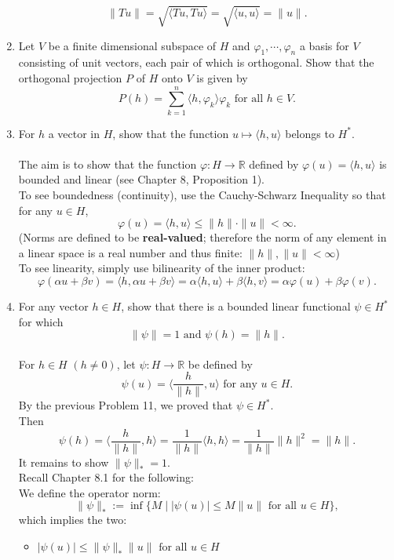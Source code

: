 \begin{enumerate}
    \[
        \|Tu\|=\sqrt{\langle Tu,Tu\rangle}=\sqrt{\langle u,u\rangle}=\|u\|.
    \]
    \item Let $V$ be a finite dimensional subspace of $H$ and $\varphi_1,\cdots,\varphi_n$ a basis for $V$ consisting of unit vectors, each pair of which is orthogonal. Show that the orthogonal projection $P$ of $H$ onto $V$ is given by 
    \[
        P(h)=\sum_{k=1}^n\langle h,\varphi_k\rangle\varphi_k\text{ for all }h\in V.
    \]
    \item For $h$ a vector in $H$, show that the function $u\mapsto\langle h,u\rangle$ belongs to $H^*$.\\
    \\The aim is to show that the function $\varphi:H\to\mathbb{R}$ defined by $\varphi(u)=\langle h,u\rangle$ is bounded and linear (see Chapter 8, Proposition 1).
    \\To see boundedness (continuity), use the Cauchy-Schwarz Inequality so that for any $u\in H$,
    \[
        \varphi(u)=\langle h,u\rangle\le\|h\|\cdot\|u\|<\infty.
    \]
    (Norms are defined to be \textbf{real-valued}; therefore the norm of any element in a linear space is a real number and thus finite: $\|h\|,\|u\|<\infty$)
    \\To see linearity, simply use bilinearity of the inner product:
    \[
        \varphi(\alpha u+\beta v)=\langle h,\alpha u+\beta v\rangle=\alpha\langle h,u\rangle+\beta\langle h,v\rangle=\alpha\varphi(u)+\beta\varphi(v).
    \]
    \item For any vector $h\in H$, show that there is a bounded linear functional $\psi\in H^*$ for which 
    \[
        \|\psi\|=1\text{ and }\psi(h)=\|h\|.  
    \]
    \\For $h\in H$ $(h\neq0)$, let $\psi:H\to\mathbb{R}$ be defined by 
    \[
        \psi(u)=\langle \frac{h}{\|h\|},u\rangle\text{ for any }u\in H.
    \]
    By the previous Problem 11, we proved that $\psi\in H^*$.
    \\Then 
    \[
        \psi(h)=\langle \frac{h}{\|h\|},h\rangle=\frac{1}{\|h\|}\langle h,h\rangle=\frac{1}{\|h\|}\|h\|^2=\|h\|.
    \]
    It remains to show $\|\psi\|_*=1$.
    \\Recall Chapter 8.1 for the following:
    \\We define the operator norm:
    \[
        \|\psi\|_*:=\inf\{M\mid|\psi(u)|\le M\|u\|\text{ for all }u\in H\},
    \]
    which implies the two: 
    \begin{itemize}
        \item $|\psi(u)|\le \|\psi\|_*\|u\|\text{ for all }u\in H$

\end{itemize}
\end{enumerate}
